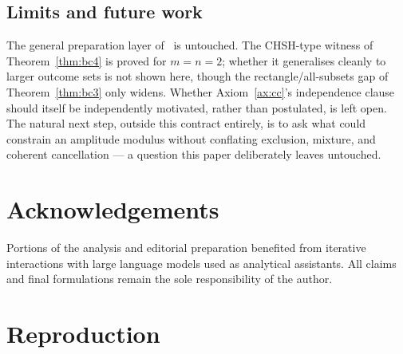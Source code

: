 \documentclass[11pt,a4paper]{article}
\begin{document}
  \subsection{Limits and future work}
    \label{ssec:limits}

    The general preparation layer of~\cite{Beau2026esub} is untouched.
    The CHSH-type witness of Theorem~\ref{thm:bc4} is proved for $m=n=2$; whether it generalises cleanly to
    larger outcome sets is not shown here, though the rectangle/all-subsets gap of Theorem~\ref{thm:bc3} only
    widens.
    Whether Axiom~\ref{ax:cc}'s independence clause should itself be independently motivated, rather than
    postulated, is left open.
    The natural next step, outside this contract entirely, is to ask what could constrain an amplitude
    modulus without conflating exclusion, mixture, and coherent cancellation --- a question this paper
    deliberately leaves untouched.

  \section*{Acknowledgements}
    Portions of the analysis and editorial preparation benefited from iterative interactions with large
    language models used as analytical assistants.
    All claims and final formulations remain the sole responsibility of the author.

  \appendix

  \section{Reproduction}
  \label{app:repro}
\end{document}
